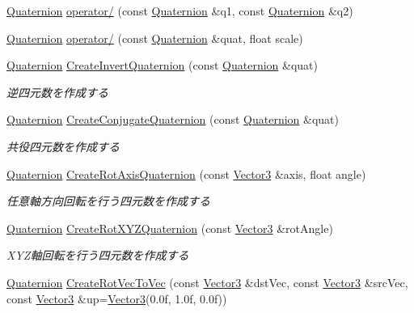 \begin{DoxyCompactItemize}
\item 
\mbox{\hyperlink{struct_math_1_1_quaternion}{Quaternion}} \mbox{\hyperlink{namespace_math_aad9dc0788e7f4ff5da49955014221905}{operator/}} (const \mbox{\hyperlink{struct_math_1_1_quaternion}{Quaternion}} \&q1, const \mbox{\hyperlink{struct_math_1_1_quaternion}{Quaternion}} \&q2)
\item 
\mbox{\hyperlink{struct_math_1_1_quaternion}{Quaternion}} \mbox{\hyperlink{namespace_math_a41131259cf64f7c0ae609d2d0538da66}{operator/}} (const \mbox{\hyperlink{struct_math_1_1_quaternion}{Quaternion}} \&quat, float scale)
\item 
\mbox{\hyperlink{struct_math_1_1_quaternion}{Quaternion}} \mbox{\hyperlink{namespace_math_ae7fbde4f45edfa3a988c966f6184fca9}{Create\+Invert\+Quaternion}} (const \mbox{\hyperlink{struct_math_1_1_quaternion}{Quaternion}} \&quat)
\begin{DoxyCompactList}\small\item\em 逆四元数を作成する \end{DoxyCompactList}\item 
\mbox{\hyperlink{struct_math_1_1_quaternion}{Quaternion}} \mbox{\hyperlink{namespace_math_a69178ac4c7a158859b5e693397f07048}{Create\+Conjugate\+Quaternion}} (const \mbox{\hyperlink{struct_math_1_1_quaternion}{Quaternion}} \&quat)
\begin{DoxyCompactList}\small\item\em 共役四元数を作成する \end{DoxyCompactList}\item 
\mbox{\hyperlink{struct_math_1_1_quaternion}{Quaternion}} \mbox{\hyperlink{namespace_math_a75a9db6fc0b36439d59d46bc89b2f254}{Create\+Rot\+Axis\+Quaternion}} (const \mbox{\hyperlink{struct_math_1_1_vector3}{Vector3}} \&axis, float angle)
\begin{DoxyCompactList}\small\item\em 任意軸方向回転を行う四元数を作成する \end{DoxyCompactList}\item 
\mbox{\hyperlink{struct_math_1_1_quaternion}{Quaternion}} \mbox{\hyperlink{namespace_math_a50fabf83a1d5a726f448e8085c6ce06f}{Create\+Rot\+X\+Y\+Z\+Quaternion}} (const \mbox{\hyperlink{struct_math_1_1_vector3}{Vector3}} \&rot\+Angle)
\begin{DoxyCompactList}\small\item\em X\+Y\+Z軸回転を行う四元数を作成する \end{DoxyCompactList}\item 
\mbox{\hyperlink{struct_math_1_1_quaternion}{Quaternion}} \mbox{\hyperlink{namespace_math_adc7f7b4f59532bf2b31aebf97743c8a9}{Create\+Rot\+Vec\+To\+Vec}} (const \mbox{\hyperlink{struct_math_1_1_vector3}{Vector3}} \&dst\+Vec, const \mbox{\hyperlink{struct_math_1_1_vector3}{Vector3}} \&src\+Vec, const \mbox{\hyperlink{struct_math_1_1_vector3}{Vector3}} \&up=\mbox{\hyperlink{struct_math_1_1_vector3}{Vector3}}(0.\+0f, 1.\+0f, 0.\+0f))

\end{DoxyCompactItemize}

